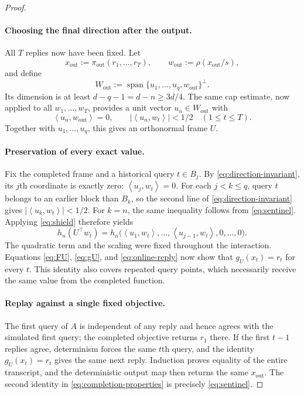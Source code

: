 \documentclass[11pt]{article}
\numberwithin{equation}{section}
\theoremstyle{definition}
\theoremstyle{remark}
\newcommand{\ip}[2]{\left\langle #1,#2\right\rangle}
\newcommand{\Span}{\operatorname{span}}
\begin{document}
\begin{proof}
\paragraph{Choosing the final direction after the output.}
All $T$ replies now have been fixed. Let
\[
    x_{\mathrm{out}}:=\pi_{\mathrm{out}}(r_1,\ldots,r_T),\qquad
    w_{\mathrm{out}}:=\rho(x_{\mathrm{out}}/s),
\]
and define
\begin{equation}
    W_{\mathrm{out}}:=\Span\{u_1,\ldots,u_q,w_{\mathrm{out}}\}^\perp.
    \label{eq:Wout}
\end{equation}
Its dimension is at least $d-q-1=d-n\geq3d/4$.
The same cap estimate, now applied to all $w_1,\ldots,w_T$, provides a
unit vector $u_n\in W_{\mathrm{out}}$ with
\begin{equation}
    \ip{u_n}{w_{\mathrm{out}}}=0,\qquad
    |\ip{u_n}{w_t}|<1/2\quad(1\leq t\leq T).
    \label{eq:sentinel}
\end{equation}
Together with $u_1,\ldots,u_q$, this gives an orthonormal frame $U$.

\paragraph{Preservation of every exact value.}
Fix the completed frame and a historical query $t\in B_j$.
By \eqref{eq:direction-invariant}, its $j$th coordinate is exactly zero:
$\ip{u_j}{w_t}=0$. For each $j<k\leq q$, query $t$ belongs to an earlier
block than $B_k$, so the second line of \eqref{eq:direction-invariant}
gives $|\ip{u_k}{w_t}|<1/2$. For $k=n$, the same inequality follows from
\eqref{eq:sentinel}. Applying \eqref{eq:shield} therefore yields
\[
    h_n(U^\top w_t)
    =h_n\bigl(\ip{u_1}{w_t},\ldots,\ip{u_{j-1}}{w_t},0,\ldots,0\bigr).
\]
The quadratic term and the scaling were fixed throughout the interaction.
Equations \eqref{eq:FU}, \eqref{eq:gU}, and \eqref{eq:online-reply} now show
that $g_U(x_t)=r_t$ for every $t$.
This identity also covers repeated query points, which necessarily receive
the same value from the completed function.

\paragraph{Replay against a single fixed objective.}
The first query of $A$ is independent of any reply and hence agrees with
the simulated first query; the completed objective returns $r_1$ there.
If the first $t-1$ replies agree, determinism forces the same $t$th query,
and the identity $g_U(x_t)=r_t$ gives the same next reply.
Induction proves equality of the entire transcript, and the deterministic
output map then returns the same $x_{\mathrm{out}}$.
The second identity in \eqref{eq:completion-properties} is precisely
\eqref{eq:sentinel}.
\end{proof}
\end{document}
